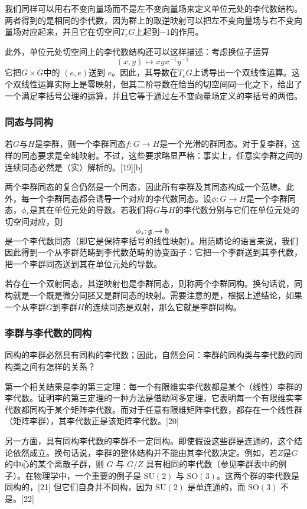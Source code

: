 我们同样可以用右不变向量场而不是左不变向量场来定义单位元处的李代数结构。两者得到的是相同的李代数，因为群上的取逆映射可以把左不变向量场与右不变向量场对应起来，并且它在切空间$T_{e}G$上起到$-1$的作用。

此外，单位元处切空间上的李代数结构还可以这样描述：考虑换位子运算
$$
(x, y) \mapsto xyx^{-1}y^{-1}~
$$
它把$G \times G$中的 $(e, e)$送到 $e$。因此，其导数在$T_{e}G$上诱导出一个双线性运算。这个双线性运算实际上是零映射，但其二阶导数在恰当的切空间同一化之下，给出了一个满足李括号公理的运算，并且它等于通过左不变向量场定义的李括号的两倍。
\subsubsection{同态与同构}
若$G$与$H$是李群，则一个李群同态$f : G \to H$是一个光滑的群同态。对于复李群，这样的同态要求是全纯映射。不过，这些要求略显严格：事实上，任意实李群之间的连续同态必然是（实）解析的。[19][b]

两个李群同态的复合仍然是一个同态，因此所有李群及其同态构成一个范畴。此外，每一个李群同态都会诱导一个对应的李代数同态。设$\phi : G \to H$是一个李群同态，$\phi_{*}$是其在单位元处的导数。若我们将$G$与$H$的李代数分别与它们在单位元处的切空间对应，则
$$
\phi_{*} : \mathfrak{g} \to \mathfrak{h}~
$$
是一个李代数同态（即它是保持李括号的线性映射）。用范畴论的语言来说，我们因此得到一个从李群范畴到李代数范畴的协变函子：它把一个李群送到其李代数，把一个李群同态送到其在单位元处的导数。

若存在一个双射同态，其逆映射也是李群同态，则称两个李群同构。换句话说，同构就是一个既是微分同胚又是群同态的映射。需要注意的是，根据上述结论，如果一个从李群$G$到李群$H$的连续同态是双射，那么它就是李群同构。
\subsubsection{李群与李代数的同构}
同构的李群必然具有同构的李代数；因此，自然会问：李群的同构类与李代数的同构类之间有怎样的关系？

第一个相关结果是李的第三定理：每一个有限维实李代数都是某个（线性）李群的李代数。证明李的第三定理的一种方法是借助阿多定理，它表明每一个有限维实李代数都同构于某个矩阵李代数。而对于任意有限维矩阵李代数，都存在一个线性群（矩阵李群），其李代数正是该矩阵李代数。[20]

另一方面，具有同构李代数的李群不一定同构。即使假设这些群是连通的，这个结论依然成立。换句话说，李群的整体结构并不能由其李代数决定。例如，若$Z$是$G$的中心的某个离散子群，则 $G$ 与 $G/Z$ 具有相同的李代数（参见李群表中的例子）。在物理学中，一个重要的例子是 $\mathrm{SU}(2)$ 与 $\mathrm{SO}(3)$。这两个群的李代数是同构的，[21] 但它们自身并不同构，因为 $\mathrm{SU}(2)$ 是单连通的，而 $\mathrm{SO}(3)$ 不是。[22]

